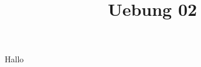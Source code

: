\documentclass[12p,marginpar=false, accentcolor=TUDa-2c]{tudapub}
\title{Uebung 02}
\begin{document}
	\maketitle
	Hallo
\end{document}
